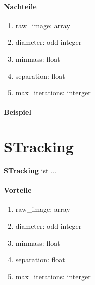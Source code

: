 	\paragraph{Nachteile}
		\begin{enumerate}
    			\item raw\_image: array \\

    			\item diameter: odd integer \\

    			\item minmass: float \\
    			
    			\item separation: float\\
 			
    			\item max\_iterations: interger\\
    			
		\end{enumerate}
		
	\paragraph{Beispiel}

\section{STracking}
\textbf{STracking} ist ... 

	\paragraph{Vorteile}
		\begin{enumerate}
    			\item raw\_image: array \\

    			\item diameter: odd integer \\

    			\item minmass: float \\
    			
    			\item separation: float\\
 			
    			\item max\_iterations: interger\\
    			
		\end{enumerate}
		
